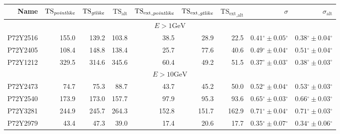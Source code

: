 \documentclass[12pt,preprint]{aastex}
\newcommand{\gev}{\text{GeV}\xspace}
\newcommand{\tsext}{{\ensuremath{\text{TS}_\text{ext}}}\xspace}
\newcommand{\tsextpointlike}{\ensuremath{\tsext_{,\pointlike}}\xspace}
\newcommand{\tsextgtlike}{\ensuremath{\tsext_{,\gtlike}}\xspace}
\newcommand{\tsextalt}{\ensuremath{\tsext_{,\alt}}\xspace}
\newcommand{\ts}{\text{TS}\xspace}
\newcommand{\alt}{\text{alt}\xspace}
\renewcommand{\deg}{\ensuremath{^\circ}\xspace}
\newcommand{\pointlike}{\text{\em pointlike}\xspace}
\newcommand{\gtlike}{\text{\em gtlike}\xspace}
\begin{document}
  \clearpage
  \begin{table}
    \begin{centering}
      \begin{tabular}{r|rrrrrrrr}
        \hline
        \hline
        Name                 &     $\ts_\pointlike$ &        $\ts_\gtlike$ &           $\ts_\alt$ &          \tsextpointlike &           \tsextgtlike &            \tsextalt &                    $\sigma$ &               $\sigma_\alt$ \\
        \hline
        \multicolumn{9}{c}{$E > 1\gev$} \\
        \hline
        P72Y2516             &                155.0 &                139.2 &                103.8 &                     38.5 &                   28.9 &                 22.5 & $  0.41\deg \pm   0.05\deg$ & $  0.38\deg \pm   0.04\deg$ \\
        P72Y2405             &                108.4 &                148.8 &                138.4 &                     25.7 &                   77.6 &                 40.6 & $  0.49\deg \pm   0.04\deg$ & $  0.51\deg \pm   0.04\deg$ \\
        P72Y1212             &                329.5 &                314.6 &                345.6 &                     60.4 &                   49.2 &                 51.5 & $  0.37\deg \pm   0.03\deg$ & $  0.38\deg \pm   0.03\deg$ \\
        \hline
        \multicolumn{9}{c}{$E > 10\gev$} \\
        \hline
        P72Y2473             &                 74.7 &                 75.3 &                 88.7 &                     43.7 &                   45.2 &                 50.0 & $  0.52\deg \pm   0.04\deg$ & $  0.53\deg \pm   0.03\deg$ \\
        P72Y2540             &                173.9 &                173.0 &                157.7 &                     97.9 &                   95.3 &                 93.6 & $  0.65\deg \pm   0.03\deg$ & $  0.66\deg \pm   0.03\deg$ \\
        P72Y3281             &                244.9 &                245.7 &                264.3 &                    152.8 &                  151.7 &                162.9 & $  0.71\deg \pm   0.04\deg$ & $  0.71\deg \pm   0.03\deg$ \\
        P72Y2979             &                 43.4 &                 47.3 &                 39.0 &                     17.4 &                   20.6 &                 17.7 & $  0.35\deg \pm   0.07\deg$ & $  0.34\deg \pm   0.06\deg$ \\

\end{tabular}
\end{centering}
\end{table}
\end{document}
